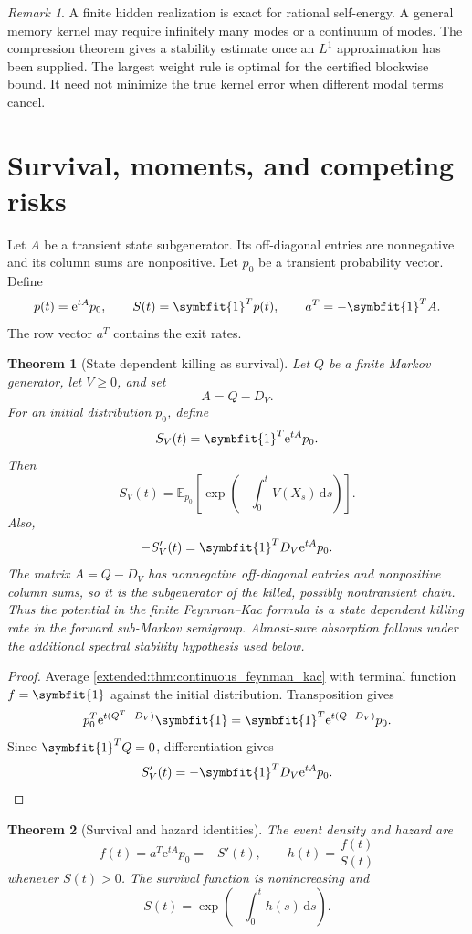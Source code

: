 \documentclass[11pt,letterpaper]{article}
\newtheorem{theorem}{Theorem}[section]
\theoremstyle{plain}
\theoremstyle{plain}
\theoremstyle{plain}
\theoremstyle{definition}
\theoremstyle{definition}
\theoremstyle{definition}
\theoremstyle{definition}
\theoremstyle{definition}
\theoremstyle{remark}
\theoremstyle{remark}
\newtheorem{remark}[remark]{Remark}
\theoremstyle{remark}
\theoremstyle{remark}
\theoremstyle{remark}
\newcommand{\Exp}{\mathbb E}
\theoremstyle{remark}
\newcommand{\e}{\mathrm e}
\newcommand{\one}{\bm 1}
\newcommand{\dd}{\,\mathrm d}
\providecommand{\bm}[1]{\symbfit{#1}}
\let\KomorebiPrimitivemathbb\mathbb
\renewcommand{\mathbb}[1]{{\KomorebiPrimitivemathbb{#1}}}
\let\KomorebiPrimitivemathrm\mathrm
\renewcommand{\mathrm}[1]{{\KomorebiPrimitivemathrm{#1}}}
\begin{document}
\begin{remark}\label{extended:record:096}
A finite hidden realization is exact for rational self-energy. A general memory kernel may require infinitely many modes or a continuum of modes. The compression theorem gives a stability estimate once an \(L^1\) approximation has been supplied. The largest weight rule is optimal for the certified blockwise bound. It need not minimize the true kernel error when different modal terms cancel.
\end{remark}

\FloatBarrier
\section{Survival, moments, and competing risks}\label{extended:section:16}\label{extended:sec:survival}

Let \(A\) be a transient state subgenerator. Its off-diagonal entries are nonnegative and its column sums are nonpositive. Let \(p_0\) be a transient probability vector. Define
\[
p(t)=\e^{tA}p_0,
\qquad
S(t)=\one^Tp(t),
\qquad
a^T=-\one^TA.
\]
The row vector \(a^T\) contains the exit rates.

\begin{theorem}[State dependent killing as survival]\label{extended:record:097}\label{extended:thm:killing_survival}
Let \(Q\) be a finite Markov generator, let \(V\geq0\), and set
\[
A=Q-D_V.
\]
For an initial distribution \(p_0\), define
\[
S_V(t)=\one^T\e^{tA}p_0.
\]
Then
\[
S_V(t)
=
\Exp_{p_0}
\left[
\exp\left(
-\int_0^tV(X_s)\dd s
\right)
\right].
\]
Also,
\[
-S_V'(t)
=
\one^TD_V\e^{tA}p_0.
\]
The matrix \(A=Q-D_V\) has nonnegative off-diagonal entries and nonpositive column sums, so it is the subgenerator of the killed, possibly nontransient chain. Thus the potential in the finite Feynman--Kac formula is a state dependent killing rate in the forward sub-Markov semigroup. Almost-sure absorption follows under the additional spectral stability hypothesis used below.
\end{theorem}

\begin{proof}
Average \cref{extended:thm:continuous_feynman_kac} with terminal function \(f=\one\) against the initial distribution. Transposition gives
\[
p_0^T\e^{t(Q^T-D_V)}\one
=
\one^T\e^{t(Q-D_V)}p_0.
\]
Since \(\one^TQ=0\), differentiation gives
\[
S_V'(t)
=
-\one^TD_V\e^{tA}p_0.
\]
\end{proof}

\begin{theorem}[Survival and hazard identities]\label{extended:record:098}\label{extended:thm:survival_hazard}
The event density and hazard are
\[
f(t)=a^T\e^{tA}p_0=-S'(t),
\qquad
h(t)=\frac{f(t)}{S(t)}
\]
whenever \(S(t)>0\). The survival function is nonincreasing and
\[
S(t)
=
\exp\left(
-\int_0^th(s)\dd s
\right).
\]
\end{theorem}
\end{document}
